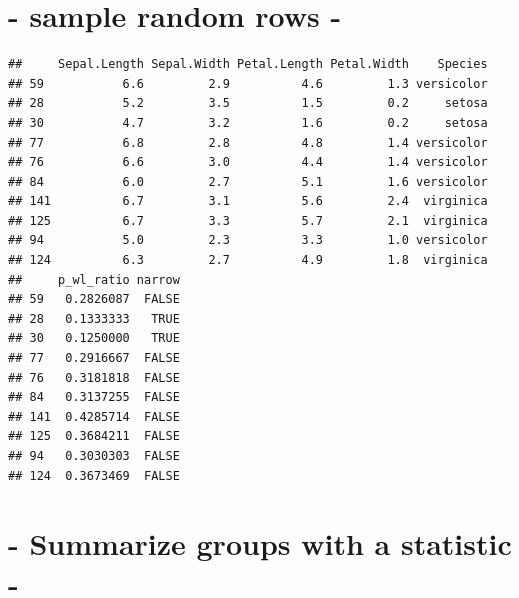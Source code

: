 \documentclass[]{article}
\newenvironment{Shaded}{\begin{snugshade}}{\end{snugshade}}
\newcommand{\CommentTok}[1]{\textcolor[rgb]{0.56,0.35,0.01}{\textit{#1}}}
\newcommand{\DataTypeTok}[1]{\textcolor[rgb]{0.13,0.29,0.53}{#1}}
\newcommand{\DecValTok}[1]{\textcolor[rgb]{0.00,0.00,0.81}{#1}}
\newcommand{\KeywordTok}[1]{\textcolor[rgb]{0.13,0.29,0.53}{\textbf{#1}}}
\newcommand{\NormalTok}[1]{#1}
\newcommand{\OperatorTok}[1]{\textcolor[rgb]{0.81,0.36,0.00}{\textbf{#1}}}
\newcommand{\StringTok}[1]{\textcolor[rgb]{0.31,0.60,0.02}{#1}}
\begin{document}
\hypertarget{sample-random-rows--}{%
\section{- sample random rows -}\label{sample-random-rows--}}

\begin{Shaded}
\end{Shaded}

\begin{verbatim}
##     Sepal.Length Sepal.Width Petal.Length Petal.Width    Species
## 59           6.6         2.9          4.6         1.3 versicolor
## 28           5.2         3.5          1.5         0.2     setosa
## 30           4.7         3.2          1.6         0.2     setosa
## 77           6.8         2.8          4.8         1.4 versicolor
## 76           6.6         3.0          4.4         1.4 versicolor
## 84           6.0         2.7          5.1         1.6 versicolor
## 141          6.7         3.1          5.6         2.4  virginica
## 125          6.7         3.3          5.7         2.1  virginica
## 94           5.0         2.3          3.3         1.0 versicolor
## 124          6.3         2.7          4.9         1.8  virginica
##     p_wl_ratio narrow
## 59   0.2826087  FALSE
## 28   0.1333333   TRUE
## 30   0.1250000   TRUE
## 77   0.2916667  FALSE
## 76   0.3181818  FALSE
## 84   0.3137255  FALSE
## 141  0.4285714  FALSE
## 125  0.3684211  FALSE
## 94   0.3030303  FALSE
## 124  0.3673469  FALSE
\end{verbatim}

\hypertarget{summarize-groups-with-a-statistic--}{%
\section{- Summarize groups with a statistic
-}\label{summarize-groups-with-a-statistic--}}

\begin{Shaded}
\end{Shaded}
\end{document}
